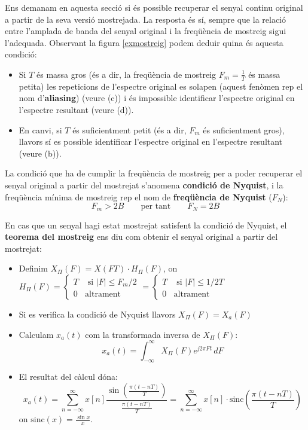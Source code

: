 \documentclass{article}
\begin{document}
Ens demanam en aquesta secci\'o si \'es possible recuperar el senyal continu original a partir de la 
seva versi\'o mostrejada. La resposta \'es s\'i, sempre que la relaci\'o entre l'amplada de banda del
senyal original i la freq\"u\`encia de mostreig sigui l'adequada.
Observant la figura \ref{exmostreig} podem deduir quina \'es aquesta condici\'o:
\renewcommand{\labelitemi}{-}
\begin{itemize}
\item Si $T$ \'es massa gros (\'es a dir, la freq\"u\`encia de mostreig $F_m=\frac{1}{T}$ 
\'es massa petita) les repeticions de l'espectre original es solapen (aquest fen\`omen
rep el nom d'\textbf{aliasing}) (veure (c))
i \'es impossible identificar l'espectre original en l'espectre resultant (veure (d)).
\item En canvi, si $T$ \'es suficientment petit (\'es a dir, $F_m$ \'es suficientment gros), llavors
s\'i es possible identificar l'espectre original en l'espectre resultant (veure (b)).
\end{itemize}

La condici\'o que ha de cumplir la freq\"u\`encia de mostreig per a poder recuperar el senyal original
a partir del mostrejat s'anomena \textbf{condici\'o de Nyquist}, i la freq\"u\`encia m\'inima
de mostreig rep el nom de \textbf{freq\"u\`encia de Nyquist} ($F_N$):
\[
F_m > 2B \qquad \text{per tant} \qquad F_N=2B
\]

En cas que un senyal hagi estat mostrejat satisfent la condici\'o de Nyquist, el \textbf{teorema del
mostreig} ens diu com obtenir el senyal original a partir del mostrejat: 
\begin{itemize}
\item Definim $X_{\Pi}(F)=X(FT) \cdot H_{\Pi}(F)$, on
$H_{\Pi}(F)=\begin{cases} T & \text{ si } |F| \leq F_m/2 \\ 0 & \text{altrament} \end{cases}=
\begin{cases} T & \text{ si } |F| \leq 1/2T \\ 0 & \text{altrament} \end{cases}$
\item Si es verifica la condici\'o de Nyquist llavors $X_{\Pi}(F)=X_a(F)$ 
\item Calculam $x_a(t)$ com la transformada inversa de $X_{\Pi}(F)$:
\[
x_a(t)=\int_{-\infty}^\infty X_{\Pi}(F) e^{j 2 \pi F t} \, dF
\]
\item El resultat del c\`alcul d\'ona:
\[
x_a(t)=\sum_{n=-\infty}^\infty x[n] \frac{\sin(\frac{\pi(t-nT)}{T})}{\frac{\pi(t-nT)}{T}}=
\sum_{n=-\infty}^\infty x[n] \cdot \mathrm{sinc}(\frac{\pi(t-nT)}{T})
\]
\noindent
on $\mathrm{sinc}(x)=\frac{\sin x}{x}$.
\end{itemize}
\end{document}
